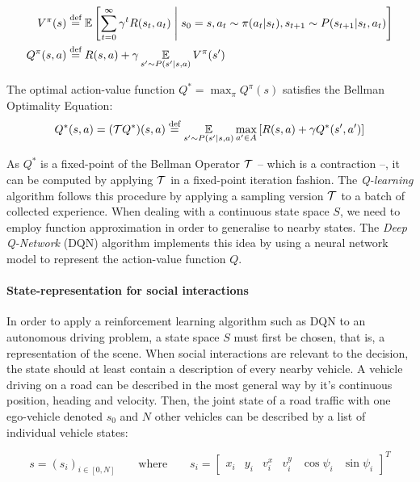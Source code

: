 \documentclass{article}
\begin{document}
\begin{align*}
V^\pi(s) &\eqdef \expectedvalue\left[\sum_{t=0}^\infty \gamma^t R(s_t, a_t)\condbar s_0=s, a_t\sim \pi(a_t|s_t), s_{t+1}\sim P(s_{t+1}|s_t, a_t)\right]\\
Q^\pi(s, a) &\eqdef R(s, a) + \gamma \expectedvalueover{s'\sim P(s'|s, a)} V^\pi(s')
\end{align*}

The optimal action-value function $Q^* =  \max_\pi Q^\pi(s)$ satisfies the Bellman Optimality Equation:
\begin{equation*}
Q^*(s, a) = (\cT Q^*) (s, a) \eqdef \expectedvalueover{s'\sim P(s'|s, a)} \max_{a'\in A} \left[R(s, a) + \gamma Q^*(s', a')\right]
\end{equation*}

As $Q^*$ is a fixed-point of the Bellman Operator $\mathcal{T}$ \citep{Bellman56} -- which is a contraction --, it can be computed by applying $\mathcal{T}$ in a fixed-point iteration fashion. The \emph{Q-learning} algorithm \citep{Watkins1992} follows this procedure by applying a sampling version $\mathcal{T}$ to a batch of collected experience. When dealing with a continuous state space $S$, we need to employ function approximation in order to generalise to nearby states. The \emph{Deep Q-Network} (DQN) algorithm \citep{Mnih2015} implements this idea by using a neural network model to represent the action-value function $Q$.

\paragraph{State-representation for social interactions}

In order to apply a reinforcement learning algorithm such as DQN to an autonomous driving problem, a state space $S$ must first be chosen, that is, a representation of the scene. When social interactions are relevant to the decision, the state should at least contain a description of every nearby vehicle. A vehicle driving on a road can be described in the most general way by it's continuous position, heading and velocity. Then, the joint state of a road traffic with one ego-vehicle denoted $s_0$ and $N$ other vehicles can be described by a list of individual vehicle states:

\begin{equation}
s = \left( s_i \right)_{i \in [0, N]}\qquad
\text{where}\qquad
s_i = \begin{bmatrix}
x_i & y_i & v^x_i & v^y_i & \cos\psi_i & \sin \psi_i
\end{bmatrix}^T
\label{eq:coordinates}
\end{equation}
\end{document}
